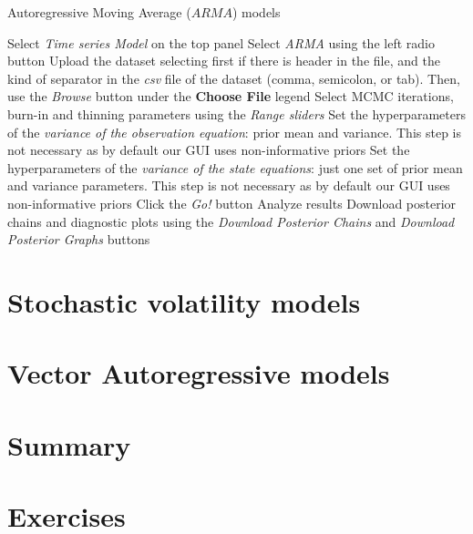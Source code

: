 \begin{algorithm}[h!]
	\caption{Autoregressive Moving Average ($ARMA$) models}\label{alg:ARMA}
	\begin{algorithmic}[1]  		 			
		\State Select \textit{Time series Model} on the top panel
		\State Select \textit{ARMA} using the left radio button
		\State Upload the dataset selecting first if there is header in the file, and the kind of separator in the \textit{csv} file of the dataset (comma, semicolon, or tab). Then, use the \textit{Browse} button under the \textbf{Choose File} legend
		\State Select MCMC iterations, burn-in and thinning parameters using the \textit{Range sliders}
		\State Set the hyperparameters of the \textit{variance of the observation equation}: prior mean and variance. This step is not necessary as by default our GUI uses non-informative priors
		\State Set the hyperparameters of the \textit{variance of the state equations}: just one set of prior mean and variance parameters. This step is not necessary as by default our GUI uses non-informative priors
		\State Click the \textit{Go!} button
		\State Analyze results
		\State Download posterior chains and diagnostic plots using the \textit{Download Posterior Chains} and \textit{Download Posterior Graphs} buttons
	\end{algorithmic} 
\end{algorithm}
  

  
\section{Stochastic volatility models}\label{sec83}  



\section{Vector Autoregressive models}\label{sec84}

\section{Summary}\label{sec85}

\section{Exercises}\label{sec86}

